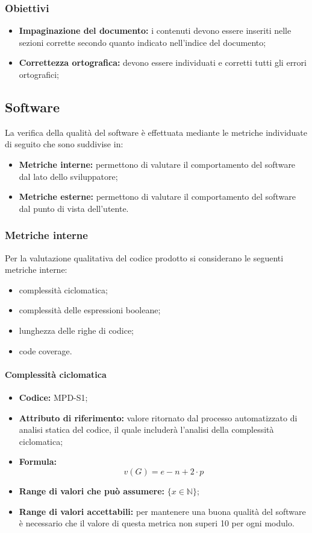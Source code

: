 \subsubsection{Obiettivi}
\begin{itemize}
    \item \textbf{Impaginazione del documento:} i contenuti devono essere inseriti nelle sezioni corrette secondo quanto indicato nell'indice del documento;
    \item \textbf{Correttezza ortografica:} devono essere individuati e corretti tutti gli errori ortografici;
\end{itemize}

\subsection{Software}
La verifica della qualità del software è effettuata mediante le metriche individuate di seguito che sono suddivise in:

\begin{itemize}
    \item \textbf{Metriche interne:} permettono di valutare il comportamento del software dal lato dello sviluppatore;
    \item \textbf{Metriche esterne:} permettono di valutare il comportamento del software dal punto di vista dell'utente.
\end{itemize}


\subsubsection{Metriche interne}
\label{_metricheQualitaCodice}
Per la valutazione qualitativa del codice prodotto si considerano le seguenti metriche interne:
\begin{itemize}
    \item complessità ciclomatica;
    \item complessità delle espressioni booleane;
    \item lunghezza delle righe di codice;
    \item code coverage.
\end{itemize}

\paragraph{Complessità ciclomatica}
\begin{itemize}
    \item \textbf{Codice:} MPD-S1;
    \item \textbf{Attributo di riferimento:} valore ritornato dal processo automatizzato di analisi statica del codice, il quale includerà l'analisi della complessità ciclomatica;
    \item \textbf{Formula:} \[ v(G)=e-n+2\cdot p \]
    \item \textbf{Range di valori che può assumere:} $\{x \in \mathbb{N} \}$;
    \item \textbf{Range di valori accettabili:} per mantenere una buona qualità del software è necessario che il valore di questa metrica non superi
    10 per ogni modulo.
\end{itemize}

